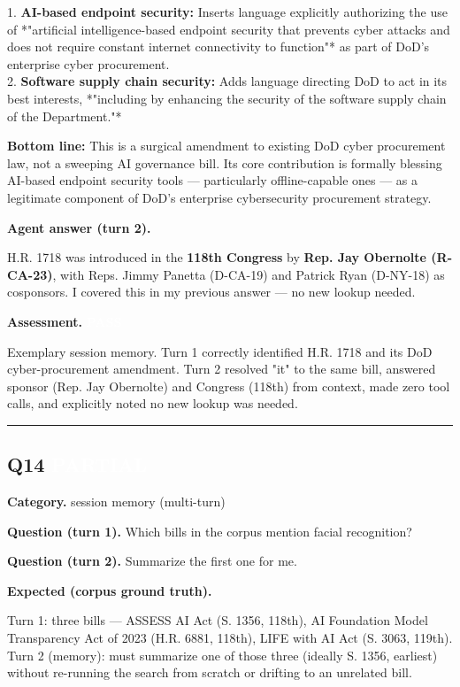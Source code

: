 \documentclass[11pt]{article}
\newcommand{\fieldlabel}[1]{\textbf{\color{navy}#1}\quad}
\begin{document}
1. \textbf{AI-based endpoint security:} Inserts language explicitly authorizing the use of *"artificial intelligence-based endpoint security that prevents cyber attacks and does not require constant internet connectivity to function"* as part of DoD's enterprise cyber procurement. \\
2. \textbf{Software supply chain security:} Adds language directing DoD to act in its best interests, *"including by enhancing the security of the software supply chain of the Department."*

\textbf{Bottom line:} This is a surgical amendment to existing DoD cyber procurement law, not a sweeping AI governance bill. Its core contribution is formally blessing AI-based endpoint security tools --- particularly offline-capable ones --- as a legitimate component of DoD's enterprise cybersecurity procurement strategy.

\fieldlabel{Agent answer (turn 2).}\par
H.R. 1718 was introduced in the \textbf{118th Congress} by \textbf{Rep. Jay Obernolte (R-CA-23)}, with Reps. Jimmy Panetta (D-CA-19) and Patrick Ryan (D-NY-18) as cosponsors. I covered this in my previous answer --- no new lookup needed.

\fieldlabel{Assessment.} \colorbox{passgreen}{\textcolor{white}{\bfseries PASS}}\par
Exemplary session memory. Turn 1 correctly identified H.R. 1718 and its DoD cyber-procurement amendment. Turn 2 resolved "it" to the same bill, answered sponsor (Rep. Jay Obernolte) and Congress (118th) from context, made zero tool calls, and explicitly noted no new lookup was needed.
\vspace{4pt}\hrule\vspace{8pt}
\subsection*{Q14 \quad \colorbox{partialorange}{\textcolor{white}{\bfseries PARTIAL}}}
\fieldlabel{Category.} session memory (multi-turn)\par
\fieldlabel{Question (turn 1).} Which bills in the corpus mention facial recognition?\par
\fieldlabel{Question (turn 2).} Summarize the first one for me.\par
\fieldlabel{Expected (corpus ground truth).}\par
Turn 1: three bills --- ASSESS AI Act (S. 1356, 118th), AI Foundation Model Transparency Act of 2023 (H.R. 6881, 118th), LIFE with AI Act (S. 3063, 119th). Turn 2 (memory): must summarize one of those three (ideally S. 1356, earliest) without re-running the search from scratch or drifting to an unrelated bill.
\end{document}
